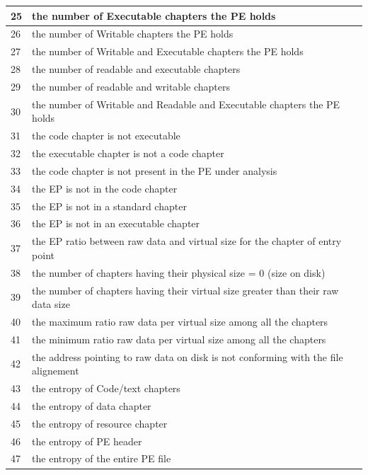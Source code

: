 \begin{appendix}
\begin{longtable}{|l|p{12cm}|}
    \hline
    25 & the number of Executable chapters the PE holds\\
    \hline
    26 & the number of Writable chapters the PE holds\\
    \hline
    27 & the number of Writable and Executable chapters the PE holds\\
    \hline
    28 & the number of readable and executable chapters\\
    \hline
    29 & the number of readable and writable chapters\\
    \hline
    30 & the number of Writable and Readable and Executable chapters the PE holds\\
    \hline
    31 & the code chapter is not executable\\
    \hline
    32 & the executable chapter is not a code chapter\\
    \hline
    33 & the code chapter is not present in the PE under analysis\\
    \hline
    34 & the EP is not in the code chapter\\
    \hline
    35 & the EP is not in a standard chapter\\
    \hline
    36 & the EP is not in an executable chapter\\
    \hline
    37 & the EP ratio between raw data and virtual size for the chapter of entry point\\
    \hline
    38 & the number of chapters having their physical size = 0 (size on disk)\\
    \hline
    39 & the number of chapters having their virtual size greater than their raw data size\\
    \hline
    40 & the maximum ratio raw data per virtual size among all the chapters\\
    \hline
    41 & the minimum ratio raw data per virtual size among all the chapters\\
    \hline
    42 & the address pointing to raw data on disk is not conforming with the file alignement\\
    \hline
    43 & the entropy of Code/text chapters\\
    \hline
    44 & the entropy of data chapter\\
    \hline
    45 & the entropy of resource chapter\\
    \hline
    46 & the entropy of PE header\\
    \hline
    47 & the entropy of the entire PE file\\
    \hline

\end{longtable}
\end{appendix}
